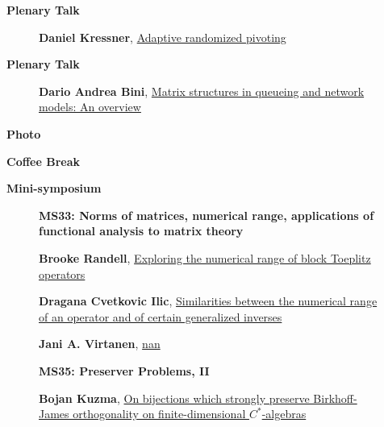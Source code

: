 \documentclass[ILAS2025-program.tex]{subfiles}
\begin{document}
    \begin{description}
    \item[] \textbf{Plenary Talk} 
    \begin{description}
        \item[] \hypertarget{up0004}{}\textbf{Daniel Kressner}, \hyperlink{down0004}{Adaptive randomized pivoting}
        \end{description}
        \item[] \textbf{Plenary Talk} 
    \begin{description}
        \item[] \hypertarget{up0005}{}\textbf{Dario Andrea Bini}, \hyperlink{down0005}{Matrix structures in queueing and network models: An overview}
        \end{description}
        \item[] \textbf{Photo} 
    \item[] \textbf{Coffee Break} 
    \item[] \textbf{Mini-symposium} 
    \begin{description}
    \item[] {\color{mstitle}\textbf{MS33: Norms of matrices, numerical range, applications of functional analysis to matrix theory}} 
    \item[] \hypertarget{up0244}{}\textbf{Brooke Randell}, \hyperlink{down0244}{Exploring the numerical range of block Toeplitz operators}
        \item[] \hypertarget{up0245}{}\textbf{Dragana Cvetkovic Ilic}, \hyperlink{down0245}{Similarities between the numerical range of an operator and of certain generalized inverses}
        \item[] \hypertarget{up0246}{}\textbf{Jani A. Virtanen}, \hyperlink{down0246}{nan}
        \end{description}
    \begin{description}
    \item[] {\color{mstitle}\textbf{MS35: Preserver Problems, II}} 
    \item[] \hypertarget{up0247}{}\textbf{Bojan Kuzma}, \hyperlink{down0247}{On bijections which strongly preserve Birkhoff-James orthogonality on finite-dimensional $C^*$-algebras}

\end{description}
\end{description}
\end{document}
